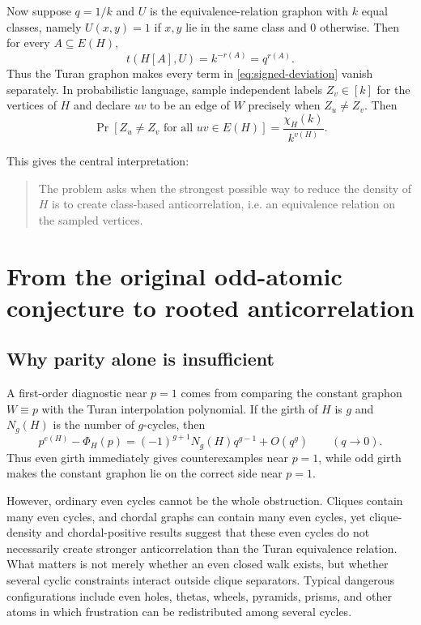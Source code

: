 \documentclass[11pt]{article}
\theoremstyle{definition}
\begin{document}
Now suppose $q=1/k$ and $U$ is the equivalence-relation graphon with $k$ equal classes, namely $U(x,y)=1$ if $x,y$ lie in the same class and $0$ otherwise.  Then for every $A\subseteq E(H)$,
\[
  t(H[A],U)=k^{-r(A)}=q^{r(A)}.
\]
Thus the Turan graphon makes every term in \eqref{eq:signed-deviation} vanish separately.  In probabilistic language, sample independent labels $Z_v\in[k]$ for the vertices of $H$ and declare $uv$ to be an edge of $W$ precisely when $Z_u\ne Z_v$.  Then
\[
  \Pr[Z_u\ne Z_v\text{ for all }uv\in E(H)]
  =\frac{\chi_H(k)}{k^{v(H)}}.
\]

This gives the central interpretation:

\begin{quote}
The problem asks when the strongest possible way to reduce the density of $H$ is to create class-based anticorrelation, i.e. an equivalence relation on the sampled vertices.
\end{quote}

\section{From the original odd-atomic conjecture to rooted anticorrelation}

\subsection{Why parity alone is insufficient}

A first-order diagnostic near $p=1$ comes from comparing the constant graphon $W\equiv p$ with the Turan interpolation polynomial.  If the girth of $H$ is $g$ and $N_g(H)$ is the number of $g$-cycles, then
\begin{equation}\label{eq:girth-expansion}
  p^{e(H)}-\Phi_H(p)=(-1)^{g+1}N_g(H)q^{g-1}+O(q^g)
  \qquad(q\to0).
\end{equation}
Thus even girth immediately gives counterexamples near $p=1$, while odd girth makes the constant graphon lie on the correct side near $p=1$.

However, ordinary even cycles cannot be the whole obstruction.  Cliques contain many even cycles, and chordal graphs can contain many even cycles, yet clique-density and chordal-positive results suggest that these even cycles do not necessarily create stronger anticorrelation than the Turan equivalence relation.  What matters is not merely whether an even closed walk exists, but whether several cyclic constraints interact outside clique separators.  Typical dangerous configurations include even holes, thetas, wheels, pyramids, prisms, and other atoms in which frustration can be redistributed among several cycles.
\end{document}
